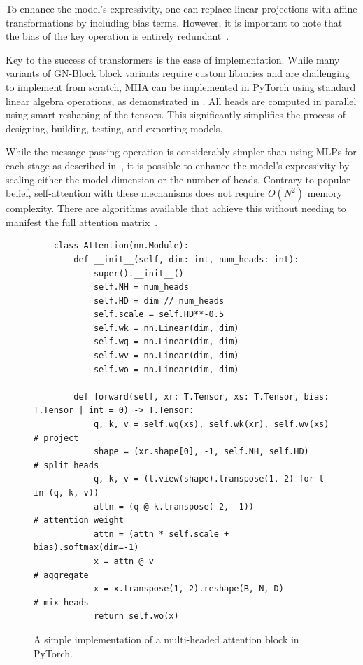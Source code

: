 To enhance the model's expressivity, one can replace linear projections with affine transformations by including bias terms. However, it is important to note that the bias of the key operation is entirely redundant~\cite{RoleBiasTerms}.

Key to the success of transformers is the ease of implementation.
While many variants of GN-Block block variants require custom libraries and are challenging to implement from scratch, MHA can be implemented in PyTorch using standard linear algebra operations, as demonstrated in .
All heads are computed in parallel using smart reshaping of the tensors.
This significantly simplifies the process of designing, building, testing, and exporting models.

While the message passing operation is considerably simpler than using MLPs for each stage as described in~, it is possible to enhance the model's expressivity by scaling either the model dimension or the number of heads.
Contrary to popular belief, self-attention with these mechanisms does not require $O(N^2)$ memory complexity. There are algorithms available that achieve this without needing to manifest the full attention matrix~\cite{SelfattentionDoesNot, FlashAttentionFastMemoryEfficient}.

\begin{figure}
    \centering
    \scriptsize
    \begin{verbatim}
    class Attention(nn.Module):
        def __init__(self, dim: int, num_heads: int):
            super().__init__()
            self.NH = num_heads
            self.HD = dim // num_heads
            self.scale = self.HD**-0.5
            self.wk = nn.Linear(dim, dim)
            self.wq = nn.Linear(dim, dim)
            self.wv = nn.Linear(dim, dim)
            self.wo = nn.Linear(dim, dim)

        def forward(self, xr: T.Tensor, xs: T.Tensor, bias: T.Tensor | int = 0) -> T.Tensor:
            q, k, v = self.wq(xs), self.wk(xr), self.wv(xs)              # project
            shape = (xr.shape[0], -1, self.NH, self.HD)                  # split heads
            q, k, v = (t.view(shape).transpose(1, 2) for t in (q, k, v))
            attn = (q @ k.transpose(-2, -1))                             # attention weight
            attn = (attn * self.scale + bias).softmax(dim=-1)
            x = attn @ v                                                 # aggregate
            x = x.transpose(1, 2).reshape(B, N, D)                       # mix heads
            return self.wo(x)
    \end{verbatim}
    \caption{A simple implementation of a multi-headed attention block in PyTorch.}
    \label{code:attention}
\end{figure}

